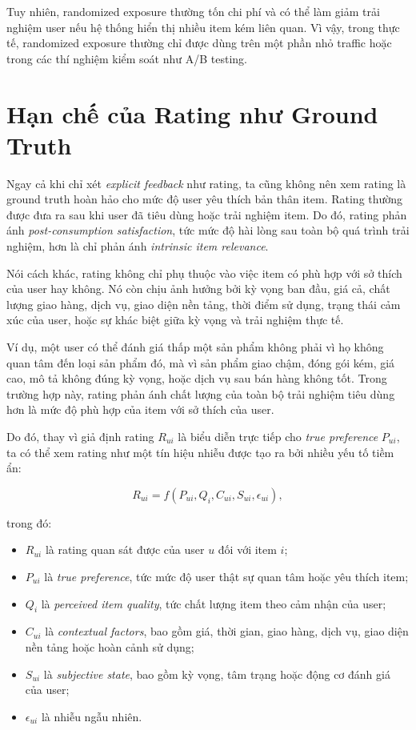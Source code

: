 \documentclass[12pt,a4paper]{article}
\begin{document}
Tuy nhiên, randomized exposure thường tốn chi phí và có thể làm giảm trải nghiệm user nếu hệ thống hiển thị nhiều item kém liên quan. 
Vì vậy, trong thực tế, randomized exposure thường chỉ được dùng trên một phần nhỏ traffic hoặc trong các thí nghiệm kiểm soát như A/B testing.

\section{Hạn chế của Rating như Ground Truth}

Ngay cả khi chỉ xét \textit{explicit feedback} như rating, ta cũng không nên xem rating là ground truth hoàn hảo cho mức độ user yêu thích bản thân item. 
Rating thường được đưa ra sau khi user đã tiêu dùng hoặc trải nghiệm item. 
Do đó, rating phản ánh \textit{post-consumption satisfaction}, tức mức độ hài lòng sau toàn bộ quá trình trải nghiệm, hơn là chỉ phản ánh \textit{intrinsic item relevance}.

Nói cách khác, rating không chỉ phụ thuộc vào việc item có phù hợp với sở thích của user hay không. 
Nó còn chịu ảnh hưởng bởi kỳ vọng ban đầu, giá cả, chất lượng giao hàng, dịch vụ, giao diện nền tảng, thời điểm sử dụng, trạng thái cảm xúc của user, hoặc sự khác biệt giữa kỳ vọng và trải nghiệm thực tế.

Ví dụ, một user có thể đánh giá thấp một sản phẩm không phải vì họ không quan tâm đến loại sản phẩm đó, mà vì sản phẩm giao chậm, đóng gói kém, giá cao, mô tả không đúng kỳ vọng, hoặc dịch vụ sau bán hàng không tốt. 
Trong trường hợp này, rating phản ánh chất lượng của toàn bộ trải nghiệm tiêu dùng hơn là mức độ phù hợp của item với sở thích của user.

Do đó, thay vì giả định rating $R_{ui}$ là biểu diễn trực tiếp cho \textit{true preference} $P_{ui}$, ta có thể xem rating như một tín hiệu nhiễu được tạo ra bởi nhiều yếu tố tiềm ẩn:

\begin{equation}
R_{ui} = f(P_{ui}, Q_i, C_{ui}, S_{ui}, \epsilon_{ui}),
\end{equation}

trong đó:

\begin{itemize}[leftmargin=*]
    \item $R_{ui}$ là rating quan sát được của user $u$ đối với item $i$;
    \item $P_{ui}$ là \textit{true preference}, tức mức độ user thật sự quan tâm hoặc yêu thích item;
    \item $Q_i$ là \textit{perceived item quality}, tức chất lượng item theo cảm nhận của user;
    \item $C_{ui}$ là \textit{contextual factors}, bao gồm giá, thời gian, giao hàng, dịch vụ, giao diện nền tảng hoặc hoàn cảnh sử dụng;
    \item $S_{ui}$ là \textit{subjective state}, bao gồm kỳ vọng, tâm trạng hoặc động cơ đánh giá của user;
    \item $\epsilon_{ui}$ là nhiễu ngẫu nhiên.
\end{itemize}
\end{document}

